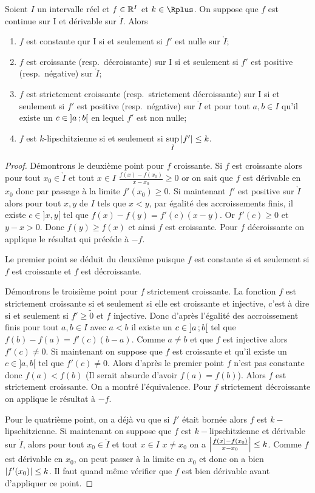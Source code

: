 \begin{theo}
  Soient $I$ un intervalle réel et $f \in \mathbb{R}^I$ et $k \in \Rplus$. On suppose que $f$ est continue sur I et dérivable sur $\mathring{I}$. Alors
  \begin{enumerate}
  \item $f$ est constante qur I si et seulement si $f'$ est nulle sur $\mathring{I}$;
  \item $f$ est croissante (resp.\ décroissante) sur I si et seulement si $f'$ est positive (resp.\ négative) sur $\mathring{I}$;
  \item $f$ est strictement croissante (resp.\ strictement décroissante) sur I si et seulement si $f'$ est positive (resp.\ négative) sur $\mathring{I}$ et pour tout $a,b \in I$ qu'il existe un $c \in \left] a \, ;  b \right[$ en lequel $f'$ est non nulle;
  \item $f$ est $k$-lipschitzienne si et seulement si $\sup\limits_{\mathring{I}} \left\lvert f'\right\rvert \leq k$.
  \end{enumerate}
\end{theo}
\begin{proof}
  Démontrons le deuxième point pour $f$ croissante. Si $f$ est croissante alors pour tout $x_0 \in \mathring{I}$ et tout $x \in I$ $\frac{f(x)-f(x_0)}{x-x_0} \geq 0$ or on sait que $f$ est dérivable en $x_0$ donc par passage à la limite $f'(x_0) \geq 0$. Si maintenant $f'$ est positive sur $\mathring{I}$ alors pour tout $x,y$ de $I$ tels que $x < y$, par égalité des accroissements finis, il existe $c \in ]x,y[$ tel que $f(x)-f(y) = f'(c)(x-y)$. Or $f'(c) \geq 0$ et $y-x > 0$. Donc $f(y) \geq f(x)$ et ainsi $f$ est croissante. Pour $f$ décroissante on applique le résultat qui précéde à $-f$.

Le premier point se déduit du deuxième puisque $f$ est constante si et seulement si $f$ est croissante et $f$ est décroissante.

Démontrons le troisième point pour $f$ strictement croissante. La fonction $f$ est strictement croissante si et seulement si elle est croissante et injective, c'est à dire si et seulement si $f' \geq \tilde{0}$ et $f$ injective. Donc d'après l'égalité des accroissement finis pour tout $a,b \in I$ avec $a <b$ il existe un $c \in \left] a \, ;  b \right[$ tel que $f(b)-f(a)=f'(c)(b-a)$. Comme $a \neq b$ et que $f$ est injective alors $f'(c) \neq 0$. Si maintenant on suppose que $f$ est croissante et qu'il existe un $c \in ]a,b[$ tel que $f'(c) \neq 0$. Alors d'après le premier point $f$ n'est pas constante donc $f(a) < f(b)$ (Il serait absurde d'avoir $f(a)=f(b)$). Alors $f$ est strictement croissante. On a montré l'équivalence. Pour $f$ strictement décroissante on applique le résultat à $-f$.

Pour le quatrième point, on a déjà vu que si $f'$ était bornée alors $f$ est $k-$lipschitzienne. Si maintenant on suppose que $f$ est $k-$lipschitzienne et dérivable sur $\mathring{I}$, alors pour tout $x_0 \in \mathring{I}$ et tout $x \in I$ $x \neq x_0$ on a $\left\lvert\frac{f(x)-f(x_0)}{x-x_0}\right\rvert \leq k$. Comme $f$ est dérivable en $x_0$, on peut passer à la limite en $x_0$ et donc on a bien $\left\lvert f'(x_0)\right\rvert \leq k$. Il faut quand même vérifier que $f$ est bien dérivable avant d'appliquer ce point.
\end{proof}


